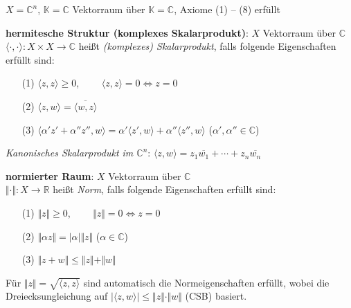 $X = \mathbb{C}^n$, $\mathbb{K} = \mathbb{C}$ Vektorraum über
$\mathbb{K} = \mathbb{C}$, Axiome (1) -- (8) erfüllt

\linie

\textbf{hermitesche Struktur (komplexes Skalarprodukt)}:
$X$ Vektorraum über $\mathbb{C}$ \\
$\langle \cdot, \cdot \rangle:
X \times X \rightarrow \mathbb{C}$ heißt \emph{(komplexes) Skalarprodukt},
falls folgende Eigenschaften erfüllt sind:

\begin{itemize}
    \item[(1)] $\langle z, z \rangle \ge 0$,
    $\qquad \langle z, z \rangle = 0 \Leftrightarrow z = 0$

    \item[(2)] $\langle z, w \rangle = \overline{\langle w, z \rangle}$

    \item[(3)] $\langle \alpha' z' + \alpha'' z'', w \rangle =
    \alpha' \langle z', w \rangle + \alpha'' \langle z'', w \rangle$
    \qquad ($\alpha', \alpha'' \in \mathbb{C}$)
\end{itemize}

\emph{Kanonisches Skalarprodukt im $\mathbb{C}^n$}:
$\langle z, w \rangle = z_1 \overline{w_1} + \cdots + z_n \overline{w_n}$

\linie

\textbf{normierter Raum}:
$X$ Vektorraum über $\mathbb{C}$ \\
$\Vert \cdot \Vert: X \rightarrow \mathbb{R}$ heißt \emph{Norm}, falls
folgende Eigenschaften erfüllt sind:

\begin{itemize}
    \item[(1)] $\Vert z \Vert \ge 0$,
    $\qquad \Vert z \Vert = 0 \Leftrightarrow z = 0$

    \item[(2)] $\Vert \alpha z \Vert = |\alpha| \Vert z \Vert$
    \qquad ($\alpha \in \mathbb{C}$)

    \item[(3)] $\Vert z + w \Vert \le \Vert z \Vert + \Vert w \Vert$
\end{itemize}

Für $\Vert z \Vert = \sqrt{\langle z, z \rangle}$ sind automatisch die
Normeigenschaften erfüllt, wobei die Dreiecksungleichung auf
$|\langle z, w \rangle| \le \Vert z \Vert \cdot \Vert w \Vert$ (CSB) basiert.

\linie


